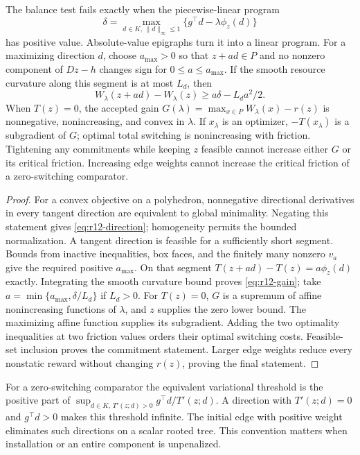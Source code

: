 \begin{proposition}\label{prop:r12-direction}
The balance test fails exactly when the piecewise-linear program
\begin{equation}\label{eq:r12-direction}
 \delta=\max_{d\in K,\,\|d\|_\infty\leq1}
                   \{g^\top d-\lambda\phi_z(d)\}
\end{equation}
has positive value. Absolute-value epigraphs turn it into a linear program. For a maximizing direction $d$, choose $a_{\max}>0$ so that $z+ad\in P$ and no nonzero component of $Dz-h$ changes sign for $0\leq a\leq a_{\max}$. If the smooth resource curvature along this segment is at most $L_d$, then
\begin{equation}\label{eq:r12-gain}
 W_\lambda(z+ad)-W_\lambda(z)\geq a\delta-L_da^2/2.
\end{equation}
When $T(z)=0$, the accepted gain $G(\lambda)=\max_{x\in P}W_\lambda(x)-r(z)$ is nonnegative, nonincreasing, and convex in $\lambda$. If $x_\lambda$ is an optimizer, $-T(x_\lambda)$ is a subgradient of $G$; optimal total switching is nonincreasing with friction. Tightening any commitments while keeping $z$ feasible cannot increase either $G$ or its critical friction. Increasing edge weights cannot increase the critical friction of a zero-switching comparator.
\end{proposition}
\begin{proof}
For a convex objective on a polyhedron, nonnegative directional derivatives in every tangent direction are equivalent to global minimality. Negating this statement gives \eqref{eq:r12-direction}; homogeneity permits the bounded normalization. A tangent direction is feasible for a sufficiently short segment. Bounds from inactive inequalities, box faces, and the finitely many nonzero $v_a$ give the required positive $a_{\max}$. On that segment $T(z+ad)-T(z)=a\phi_z(d)$ exactly. Integrating the smooth curvature bound proves \eqref{eq:r12-gain}; take $a=\min\{a_{\max},\delta/L_d\}$ if $L_d>0$. For $T(z)=0$, $G$ is a supremum of affine nonincreasing functions of $\lambda$, and $z$ supplies the zero lower bound. The maximizing affine function supplies its subgradient. Adding the two optimality inequalities at two friction values orders their optimal switching costs. Feasible-set inclusion proves the commitment statement. Larger edge weights reduce every nonstatic reward without changing $r(z)$, proving the final statement.
\end{proof}
For a zero-switching comparator the equivalent variational threshold is the positive part of $\sup_{d\in K,\,T'(z;d)>0}g^\top d/T'(z;d)$. A direction with $T'(z;d)=0$ and $g^\top d>0$ makes this threshold infinite. The initial edge with positive weight eliminates such directions on a scalar rooted tree. This convention matters when installation or an entire component is unpenalized.

